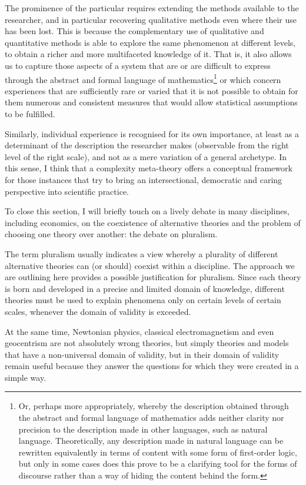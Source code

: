The prominence of the particular requires extending the methods available to the researcher, and in particular recovering qualitative methods even where their use has been lost. This is because the complementary use of qualitative and quantitative methods is able to explore the same phenomenon at different levels, to obtain a richer and more multifaceted knowledge of it. That is, it also allows us to capture those aspects of a system that are or are difficult to express through the abstract and formal language of mathematics\footnote{Or, perhaps more appropriately, whereby the description obtained through the abstract and formal language of mathematics adds neither clarity nor precision to the description made in other languages, such as natural language. Theoretically, any description made in natural language can be rewritten equivalently in terms of content with some form of first-order logic, but only in some cases does this prove to be a clarifying tool for the forms of discourse rather than a way of hiding the content behind the form.} or which concern experiences that are sufficiently rare or varied that it is not possible to obtain for them numerous and consistent measures that would allow statistical assumptions to be fulfilled.

Similarly, individual experience is recognised for its own importance, at least as a determinant of the description the researcher makes (observable from the right level of the right scale), and not as a mere variation of a general archetype.
In this sense, I think that a complexity meta-theory offers a conceptual framework for those instances that try to bring an intersectional, democratic and caring perspective into scientific practice.

To close this section, I will briefly touch on a lively debate in many disciplines, including economics, on the coexistence of alternative theories and the problem of choosing one theory over another: the debate on pluralism.

The term pluralism usually indicates a view whereby a plurality of different alternative theories can (or should) coexist within a discipline.
The approach we are outlining here provides a possible justification for pluralism.
Since each theory is born and developed in a precise and limited domain of knowledge, different theories must be used to explain phenomena only on certain levels of certain scales, whenever the domain of validity is exceeded.

At the same time, Newtonian physics, classical electromagnetism and even geocentrism are not absolutely wrong theories, but simply theories and models that have a non-universal domain of validity, but in their domain of validity remain useful because they answer the questions for which they were created in a simple way.

